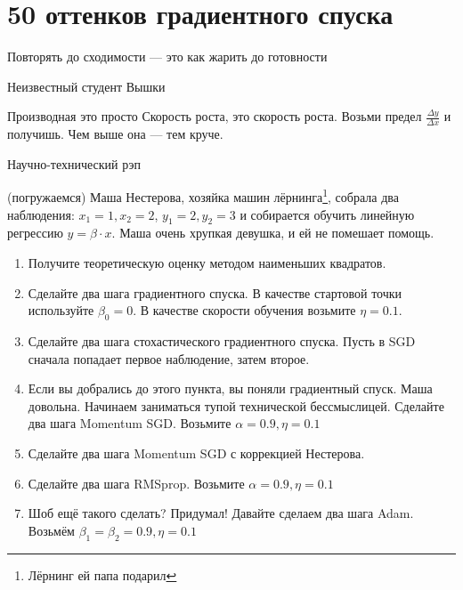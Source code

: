 
\section*{50 оттенков градиентного спуска}

\epigraph{Повторять до сходимости --- это как жарить до готовности}{Неизвестный студент Вышки}

\epigraph{Производная это просто \newline Скорость роста, это скорость роста. \newline Возьми предел $\frac{\Delta y}{\Delta x}$ и получишь. \newline Чем выше она --- тем круче.}{Научно-технический рэп}


\begin{problem}{(погружаемся)}
	Маша Нестерова, хозяйка машин лёрнинга\footnote{Лёрнинг ей папа подарил},  собрала два наблюдения: $x_1 = 1, x_2 = 2$, $y_1 = 2, y_2 = 3$ и собирается обучить линейную регрессию $y = \beta \cdot x$.  Маша очень хрупкая девушка, и ей не помешает помощь. 

	\begin{enumerate}
		\item Получите теоретическую оценку методом наименьших квадратов.
		
		\item  Сделайте два шага градиентного спуска. В качестве стартовой точки используйте $\beta_0 = 0$.  В качестве скорости обучения возьмите $\eta = 0.1$. 
		
		\item Сделайте два шага стохастического градиентного спуска.  Пусть в SGD сначала попадает первое наблюдение, затем второе. 
		
		\item Если вы добрались до этого пункта, вы поняли градиентный спуск. Маша довольна. Начинаем заниматься тупой технической бессмыслицей. Сделайте два шага Momentum SGD. Возьмите $\alpha = 0.9, \eta = 0.1$
		
		\item  Сделайте два шага Momentum SGD с коррекцией Нестерова. 
		
		\item Сделайте два шага RMSprop.  Возьмите $\alpha = 0.9, \eta = 0.1$
		
		\item  Шоб ещё такого сделать? Придумал! Давайте сделаем два шага Adam. Возьмём  $\beta_1 = \beta_2 = 0.9, \eta = 0.1$		
	\end{enumerate}
\end{problem}



